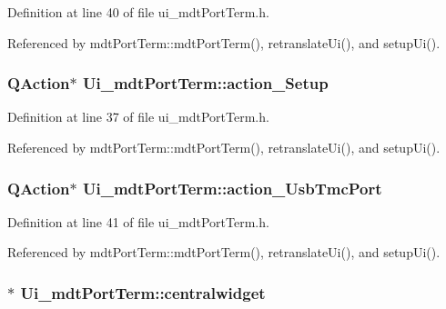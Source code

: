 Definition at line 40 of file ui\-\_\-mdt\-Port\-Term.\-h.



Referenced by mdt\-Port\-Term\-::mdt\-Port\-Term(), retranslate\-Ui(), and setup\-Ui().

\hypertarget{class_ui__mdt_port_term_a0c4f0edb985974b0caad1a02d7f8199e}{
\subsubsection[{action\-\_\-\-Setup}]{\setlength{\rightskip}{0pt plus 5cm}Q\-Action$\ast$ Ui\-\_\-mdt\-Port\-Term\-::action\-\_\-\-Setup}}\label{class_ui__mdt_port_term_a0c4f0edb985974b0caad1a02d7f8199e}


Definition at line 37 of file ui\-\_\-mdt\-Port\-Term.\-h.



Referenced by mdt\-Port\-Term\-::mdt\-Port\-Term(), retranslate\-Ui(), and setup\-Ui().

\hypertarget{class_ui__mdt_port_term_abbc97780b7856e9effb0c1452fef55dc}{
\subsubsection[{action\-\_\-\-Usb\-Tmc\-Port}]{\setlength{\rightskip}{0pt plus 5cm}Q\-Action$\ast$ Ui\-\_\-mdt\-Port\-Term\-::action\-\_\-\-Usb\-Tmc\-Port}}\label{class_ui__mdt_port_term_abbc97780b7856e9effb0c1452fef55dc}


Definition at line 41 of file ui\-\_\-mdt\-Port\-Term.\-h.



Referenced by mdt\-Port\-Term\-::mdt\-Port\-Term(), retranslate\-Ui(), and setup\-Ui().

\hypertarget{class_ui__mdt_port_term_af8899e8012439f2b421c0e9bb5f57531}{
\subsubsection[{centralwidget}]{$\ast$ Ui\-\_\-mdt\-Port\-Term\-::centralwidget}}\label{class_ui__mdt_port_term_af8899e8012439f2b421c0e9bb5f57531}


